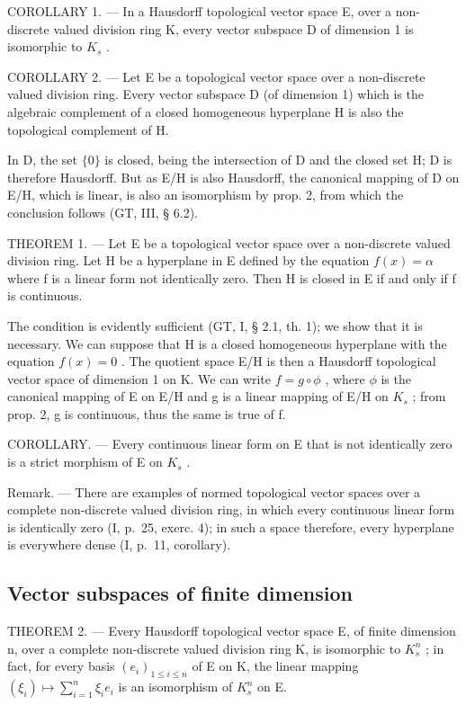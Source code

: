 COROLLARY 1. --- In a Hausdorff topological vector space E, over a non-discrete valued division ring K, every vector subspace D of dimension 1 is isomorphic to \(K_{s}\) .

COROLLARY 2. --- Let E be a topological vector space over a non-discrete valued division ring. Every vector subspace D (of dimension 1) which is the algebraic complement of a closed homogeneous hyperplane H is also the topological complement of H.

In D, the set \(\{0\}\) is closed, being the intersection of D and the closed set H; D is therefore Hausdorff. But as E/H is also Hausdorff, the canonical mapping of D on E/H, which is linear, is also an isomorphism by prop. 2, from which the conclusion follows (GT, III, § 6.2).

THEOREM 1. --- Let E be a topological vector space over a non-discrete valued division ring. Let H be a hyperplane in E defined by the equation \(f(x) = \alpha\) where f is a linear form not identically zero. Then H is closed in E if and only if f is continuous.

The condition is evidently sufficient (GT, I, § 2.1, th. 1); we show that it is necessary. We can suppose that H is a closed homogeneous hyperplane with the equation \(f(x) = 0\) . The quotient space E/H is then a Hausdorff topological vector space of dimension 1 on K. We can write \(f = g \circ \phi\) , where \(\phi\) is the canonical mapping of E on E/H and g is a linear mapping of E/H on \(K_{s}\) ; from prop. 2, g is continuous, thus the same is true of f.

COROLLARY. --- Every continuous linear form on E that is not identically zero is a strict morphism of E on \(K_{s}\) .

Remark. --- There are examples of normed topological vector spaces over a complete non-discrete valued division ring, in which every continuous linear form is identically zero (I, p.~25, exerc. 4); in such a space therefore, every hyperplane is everywhere dense (I, p.~11, corollary).

\subsection{Vector subspaces of finite dimension}

THEOREM 2. --- Every Hausdorff topological vector space E, of finite dimension n, over a complete non-discrete valued division ring K, is isomorphic to \(K_{s}^{n}\) ; in fact, for every basis \((e_{i})_{1\leqslant i\leqslant n}\) of E on K, the linear mapping \((\xi_{i})\mapsto\sum_{i=1}^{n}\xi_{i}e_{i}\) is an isomorphism of \(K_{s}^{n}\) on E.

